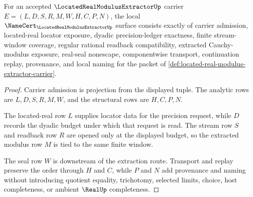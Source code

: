 \begin{theorem}
\label{thm:located-real-modulus-extractor-namecert-obligations}
For an accepted $\LocatedRealModulusExtractorUp$ carrier $E=(L,D,S,R,M,W,H,C,P,N)$, the local $\NameCert_{\LocatedRealModulusExtractorUp}$ surface consists exactly of carrier admission, located-real locator exposure, dyadic precision-ledger exactness, finite stream-window coverage, regular rational readback compatibility, extracted Cauchy-modulus exposure, real-seal nonescape, componentwise transport, continuation replay, provenance, and local naming for the packet of \autoref{def:located-real-modulus-extractor-carrier}.
\end{theorem}
\begin{proof}
Carrier admission is projection from the displayed tuple. The analytic rows are $L,D,S,R,M,W$, and the structural rows are $H,C,P,N$.

The located-real row $L$ supplies locator data for the precision request, while $D$ records the dyadic budget under which that request is read. The stream row $S$ and readback row $R$ are opened only at the displayed budget, so the extracted modulus row $M$ is tied to the same finite window.

The seal row $W$ is downstream of the extraction route. Transport and replay preserve the order through $H$ and $C$, while $P$ and $N$ add provenance and naming without introducing quotient equality, trichotomy, selected limits, choice, host completeness, or ambient $\RealUp$ completeness.
\end{proof}

